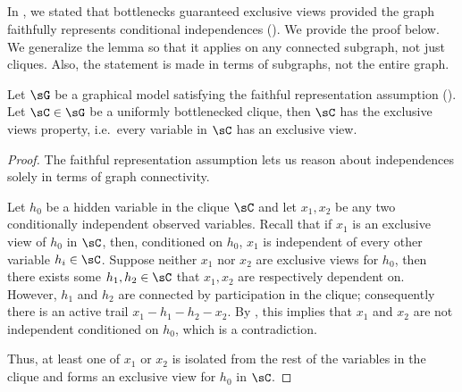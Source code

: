 \subsection{}
\label{app:exclusive-views}

In , we stated that bottlenecks guaranteed
exclusive views provided the graph faithfully represents conditional independences (). 
We provide the proof below.
  We generalize the lemma so that it applies
  on any connected subgraph, not just cliques.
  Also, the statement is made in terms of subgraphs,
  not the entire graph.

\begin{lemma*}
  Let $\sG$ be a graphical model satisfying the faithful representation assumption ().
  Let $\sC \in \sG$ be a uniformly bottlenecked clique, then
  $\sC$ has the exclusive views property, i.e.\ every variable in $\sC$
  has an exclusive view.
\end{lemma*}

\begin{proof}
The faithful representation assumption lets us
  reason about independences solely in terms of graph connectivity.

Let $h_0$ be a hidden variable in the clique $\sC$ and let $x_1, x_2$ be any
  two conditionally independent observed variables. 
Recall that if $x_1$ is an exclusive view of $h_0$ in $\sC$,
  then, conditioned on $h_0$, $x_1$ is independent of every other variable $h_i
  \in \sC$.
Suppose neither $x_1$ nor $x_2$ are exclusive views for $h_0$, 
  then there exists some $h_1, h_2 \in \sC$ that $x_1, x_2$ are respectively dependent on.
However, $h_1$ and $h_2$ are connected by participation in the clique; consequently there is an active trail $x_1 - h_1 - h_2 - x_2$. 
By , this implies that $x_1$ and $x_2$ are not
  independent conditioned on $h_0$, which is a contradiction.

Thus, at least one of $x_1$ or $x_2$ is isolated from the rest of the
variables in the clique and forms an exclusive view for $h_0$ in $\sC$.

\end{proof}

